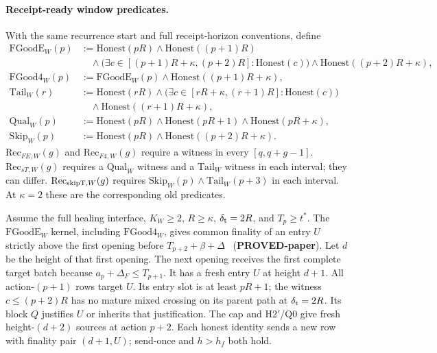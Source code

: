 \documentclass{article}
\theoremstyle{plain}
\theoremstyle{definition}
\theoremstyle{remark}
\begin{document}
\paragraph{Receipt-ready window predicates.}\label{par:window-kernels}
With the same recurrence start and full receipt-horizon conventions, define
\begin{align*}
 \mathrm{FGoodE}_W(p)&:=\mathrm{Honest}(pR)\land\mathrm{Honest}((p+1)R)\\
 &\quad\land\bigl(\exists c\in[(p+1)R+\kappa,(p+2)R]:\mathrm{Honest}(c)\bigr)
 \land\mathrm{Honest}((p+2)R+\kappa),\\
 \mathrm{FGood4}_W(p)&:=\mathrm{FGoodE}_W(p)
 \land\mathrm{Honest}((p+1)R+\kappa),\\
 \mathrm{Tail}_W(r)&:=\mathrm{Honest}(rR)
 \land\bigl(\exists c\in[rR+\kappa,(r+1)R]:\mathrm{Honest}(c)\bigr)\\
 &\quad\land\mathrm{Honest}((r+1)R+\kappa),\\
 \mathrm{Qual}_W(p)&:=\mathrm{Honest}(pR)\land\mathrm{Honest}(pR+1)
 \land\mathrm{Honest}(pR+\kappa),\\
 \mathrm{Skip}_W(p)&:=\mathrm{Honest}(pR)\land\mathrm{Honest}((p+2)R+\kappa).
\end{align*}
$\mathrm{Rec}_{FE,W}(g)$ and $\mathrm{Rec}_{F4,W}(g)$ require a witness
in every $[q,q+g-1]$.  $\mathrm{Rec}_{sT,W}(g)$ requires a
$\mathrm{Qual}_W$ witness and a $\mathrm{Tail}_W$ witness in each interval;
they can differ.  $\mathrm{Rec}_{{\rm skipT},W}(g)$ requires
$\mathrm{Skip}_W(p)\land\mathrm{Tail}_W(p+3)$ in each interval.
At $\kappa=2$ these are the corresponding old predicates.

Assume the full healing interface, $K_W\geq2$, $R\geq\kappa$,
$\delta_{\rm t}=2R$, and $T_p\geq t^*$.
The $\mathrm{FGoodE}_W$ kernel, including $\mathrm{FGood4}_W$, gives
common finality of an entry $U$ strictly above the first opening before
$T_{p+2}+\beta+\Delta$~\cite[\S5]{FW} (\textbf{PROVED-paper}).
Let $d$ be the height of that first opening.
The next opening receives the first complete target batch because
$a_p+\Delta_F\leq T_{p+1}$.  It has a fresh entry $U$ at height $d+1$.
All action-$(p+1)$ rows target $U$.  Its entry slot is at least $pR+1$;
the witness $c\leq(p+2)R$ has no mature mixed crossing on its parent
path at $\delta_{\rm t}=2R$.  Its block $Q$ justifies $U$ or inherits
that justification.  The cap and H2$'$/Q0 give fresh height-$(d+2)$
sources at action $p+2$.  Each honest identity sends a new row with
finality pair $(d+1,U)$; send-once and $h>h_f$ both hold.
\end{document}
